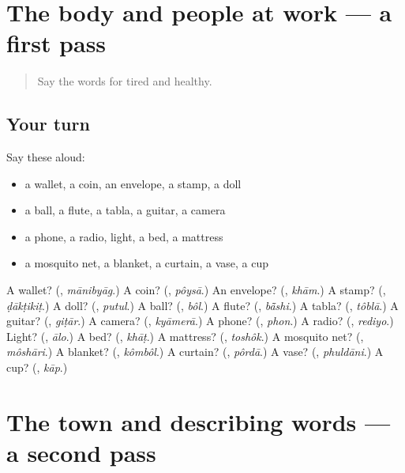 \section[(dialogue)]{The body and people at work — a first pass}

\label{lesson:BN-R137-first-pass-the-body-and-people-at-work}



\begin{quote}
Say the words for tired and healthy.
\end{quote}

\subsection*{Your turn}
Say these aloud:

\begin{itemize}
\raggedright
  \item a wallet, a coin, an envelope, a stamp, a doll
  \item a ball, a flute, a tabla, a guitar, a camera
  \item a phone, a radio, light, a bed, a mattress
  \item a mosquito net, a blanket, a curtain, a vase, a cup
\end{itemize}

\begin{tcolorbox}[breakable,colback=teal!4,colframe=teal!35!black,title={Before you move on}]
A wallet? (\textbf{}, \emph{mānibyāg}.) A coin? (\textbf{}, \emph{pôysā}.) An envelope? (\textbf{}, \emph{khām}.) A stamp? (\textbf{}, \emph{ḍākṭikiṭ}.) A doll? (\textbf{}, \emph{putul}.) A ball? (\textbf{}, \emph{bôl}.) A flute? (\textbf{}, \emph{bā̃shi}.) A tabla? (\textbf{}, \emph{tôblā}.) A guitar? (\textbf{}, \emph{giṭār}.) A camera? (\textbf{}, \emph{kyāmerā}.) A phone? (\textbf{}, \emph{phon}.) A radio? (\textbf{}, \emph{rediyo}.) Light? (\textbf{}, \emph{ālo}.) A bed? (\textbf{}, \emph{khāṭ}.) A mattress? (\textbf{}, \emph{toshôk}.) A mosquito net? (\textbf{}, \emph{môshāri}.) A blanket? (\textbf{}, \emph{kômbôl}.) A curtain? (\textbf{}, \emph{pôrdā}.) A vase? (\textbf{}, \emph{phuldāni}.) A cup? (\textbf{}, \emph{kāp}.)
\end{tcolorbox}
\section[(dialogue)]{The town and describing words — a second pass}

